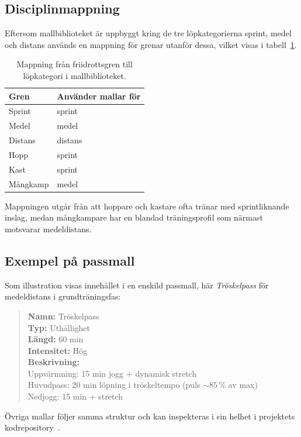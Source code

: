 \subsection{Disciplinmappning}
\label{app:mallar:mappning}

Eftersom mallbiblioteket är uppbyggt kring de tre löpkategorierna sprint,
medel och distans används en mappning för grenar utanför dessa, vilket
visas i tabell~\ref{tab:disciplinmappning}.

\begin{table}[h]
\centering
\caption{Mappning från friidrottsgren till löpkategori i mallbiblioteket.}
\label{tab:disciplinmappning}
\small
\begin{tabular}{l l}
\hline
\textbf{Gren} & \textbf{Använder mallar för} \\
\hline
Sprint    & sprint \\
Medel     & medel \\
Distans   & distans \\
Hopp      & sprint \\
Kast      & sprint \\
Mångkamp  & medel \\
\hline
\end{tabular}
\end{table}

Mappningen utgår från att hoppare och kastare ofta tränar med
sprintliknande inslag, medan mångkampare har en blandad träningsprofil
som närmast motsvarar medeldistans.

\subsection{Exempel på passmall}
\label{app:mallar:exempel}

Som illustration visas innehållet i en enskild passmall, här
\textit{Tröskelpass} för medeldistans i grundträningsfas:

\begin{quote}
\textbf{Namn:} Tröskelpass \\
\textbf{Typ:} Uthållighet \\
\textbf{Längd:} 60 min \\
\textbf{Intensitet:} Hög \\
\textbf{Beskrivning:} \\
Uppvärmning: 15 min jogg + dynamisk stretch \\
Huvudpass: 20 min löpning i tröskeltempo (puls $\sim$85\,\% av max) \\
Nedjogg: 15 min + stretch
\end{quote}

Övriga mallar följer samma struktur och kan inspekteras i sin helhet
i projektets kodrepository~\cite{Boissier_AI-baserat_traningsstod_for}.
